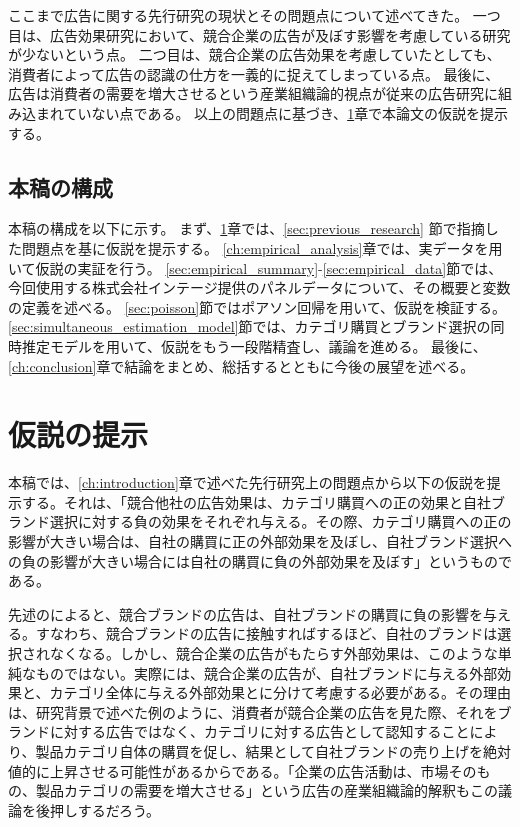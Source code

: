 \documentclass[11pt]{jsarticle}
\begin{document}
ここまで広告に関する先行研究の現状とその問題点について述べてきた。
一つ目は、広告効果研究において、競合企業の広告が及ぼす影響を考慮している研究が少ないという点。
二つ目は、競合企業の広告効果を考慮していたとしても、消費者によって広告の認識の仕方を一義的に捉えてしまっている点。
最後に、広告は消費者の需要を増大させるという産業組織論的視点が従来の広告研究に組み込まれていない点である。
以上の問題点に基づき、\ref{ch:hypothesis}章で本論文の仮説を提示する。


\subsection{本稿の構成}
\label{sec:constitution}
本稿の構成を以下に示す。
まず、\ref{ch:hypothesis}章では、\ref{sec:previous_research} 節で指摘した問題点を基に仮説を提示する。
\ref{ch:empirical_analysis}章では、実データを用いて仮説の実証を行う。
\ref{sec:empirical_summary}-\ref{sec:empirical_data}節では、今回使用する株式会社インテージ提供のパネルデータについて、その概要と変数の定義を述べる。
\ref{sec:poisson}節ではポアソン回帰を用いて、仮説を検証する。
\ref{sec:simultaneous_estimation_model}節では、カテゴリ購買とブランド選択の同時推定モデルを用いて、仮説をもう一段階精査し、議論を進める。
最後に、\ref{ch:conclusion}章で結論をまとめ、総括するとともに今後の展望を述べる。

\section{仮説の提示}
\label{ch:hypothesis}
本稿では、\ref{ch:introduction}章で述べた先行研究上の問題点から以下の仮説を提示する。それは、「競合他社の広告効果は、カテゴリ購買への正の効果と自社ブランド選択に対する負の効果をそれぞれ与える。その際、カテゴリ購買への正の影響が大きい場合は、自社の購買に正の外部効果を及ぼし、自社ブランド選択への負の影響が大きい場合には自社の購買に負の外部効果を及ぼす」というものである。

先述の\citet{shimizu1990}によると、競合ブランドの広告は、自社ブランドの購買に負の影響を与える。すなわち、競合ブランドの広告に接触すればするほど、自社のブランドは選択されなくなる。しかし、競合企業の広告がもたらす外部効果は、このような単純なものではない。実際には、競合企業の広告が、自社ブランドに与える外部効果と、カテゴリ全体に与える外部効果とに分けて考慮する必要がある。その理由は、研究背景で述べた例のように、消費者が競合企業の広告を見た際、それをブランドに対する広告ではなく、カテゴリに対する広告として認知することにより、製品カテゴリ自体の購買を促し、結果として自社ブランドの売り上げを絶対値的に上昇させる可能性があるからである。「企業の広告活動は、市場そのもの、製品カテゴリの需要を増大させる」という広告の産業組織論的解釈もこの議論を後押しするだろう。
\end{document}
